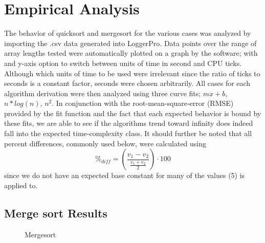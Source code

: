\documentclass[11pt,letterpaper]{report}
\begin{document}
\section*{Empirical Analysis}
The behavior of quicksort and mergesort for the various cases was analyzed by importing the .csv data generated into LoggerPro. Data points over the range of array lengths tested were automatically plotted on a graph by the software; with and y-axis option to switch between units of time in second and CPU ticks. Although which units of time to be used were irrelevant since the ratio of ticks to seconds is a constant factor, seconds were chosen arbitrarily.
All cases for each algorithm derivation were then analyzed using three curve fits; $mx+b$, $n*log{}(n)$, $n^2$. In conjunction with the root-mean-square-error (RMSE) provided by the fit function and the fact that each expected behavior is bound by these fits, we are able to see if the algorithms trend toward infinity does indeed fall into the expected time-complexity class. It should further be noted that all percent differences, commonly used below, were calculated using
\begin{equation} 
\%_{diff}  = (\frac{v_1-v_2}{\frac{v_1+v_2}{2}})  \cdot 100
\end{equation}
since we do not have an expected base constant for many of the values (5) is applied to. 



\subsection*{Merge sort Results}
\begin{figure}[h]
  \centering
  \hfill
  \hfill
  \caption{Mergesort}
\end{figure}
\end{document}
